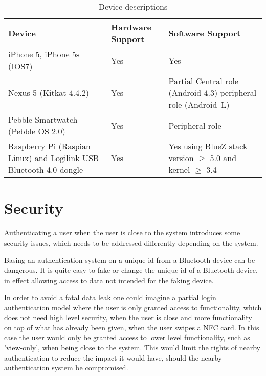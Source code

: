 \begin{table}[!t]
\caption{Device descriptions}
\label{table:devices}
\centering
\begin{tabular}{|p{3cm}|p{3.5cm}|p{4cm}|}
\hline
\textbf{Device} & \textbf{Hardware Support} & \textbf{Software Support}\\
\hline
iPhone 5, iPhone 5s (IOS7) & Yes & Yes\\
\hline
Nexus 5 \newline (Kitkat 4.4.2) & Yes & Partial \newline
Central role (Android 4.3)  \newline
peripheral role (Android~L)\\
\hline
Pebble Smartwatch (Pebble OS 2.0) & Yes & Peripheral role\\
\hline
Raspberry Pi (Raspian Linux) and Logilink USB Bluetooth 4.0 dongle & Yes & Yes using BlueZ stack version $\geq$ 5.0 and kernel $\geq$ 3.4\\
\hline

\end{tabular}
\end{table}


\section{Security}

Authenticating a user when the user is close to the system introduces some security issues, which needs to be addressed differently depending on the system.

Basing an authentication system on a unique id from a Bluetooth device can be dangerous. It is quite easy to fake or change the unique id of a Bluetooth device, in effect allowing access to data not intended for the faking device.

In order to avoid a fatal data leak one could imagine a partial login authentication model\cite{ref:covington} where the user is only granted access to functionality, which does not need high level security, when the user is close and more functionality on top of what has already been given, when the user swipes a NFC card.
In this case the user would only be granted access to lower level functionality, such as 'view-only', when being close to the system. This would limit the rights of nearby authentication to reduce the impact it would have, should the nearby authentication system be compromised.


